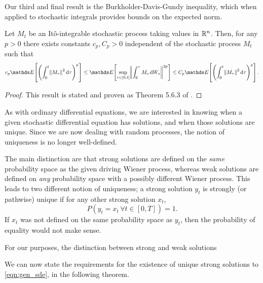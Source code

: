 Our third and final result is the Burkholder-Davis-Gundy inequality, which when applied to stochastic integrals provides bounds on the expected norm.

\begin{theorem}\label{thm:bdg}
	Let \(M_t\) be an It\^o-integrable stochastic process taking values in \(\mathbb{R}^n\).
	Then, for any \(p > 0\) there exists constants \(c_p, C_p > 0\) independent of the stochastic process \(M_t\) such that
	\[
		c_p\avg{\left(\int_0^t{\norm{M_\tau}^2\dif \tau}\right)^p} \leq \avg{\sup_{\tau \in \left[0, t\right]}\norm{\int_0^\tau{M_s\dif W_s}}^{2p}} \leq C_p\avg{\left(\int_0^t{\norm{M_\tau}^2\dif \tau}\right)^p}.
	\]
\end{theorem}
\begin{proof}
	This result is stated and proven as Theorem 5.6.3 of \citet{KallianpurSundar_2014_StochasticAnalysisDiffusion}.
\end{proof}

As with ordinary differential equations, we are interested in knowing when a given stochastic differential equation has solutions, and when those solutions are unique.
Since we are now dealing with random processes, the notion of uniqueness is no longer well-defined.

The main distinction are that strong solutions are defined on the \emph{same} probability space as the given driving Wiener process, whereas weak solutions are defined on \emph{any} probability space with a possibly different Wiener process.
This leads to two different notion of uniqueness; a strong solution \(y_t\) is strongly (or pathwise) unique if for any other strong solution \(x_t\),
\[
	P\left(y_t = x_t \, \forall t \in [0,T]\right) = 1.
\]
If \(x_t\) was not defined on the same probability space as \(y_t\), then the probability of equality would not make sense.

For our purposes, the distinction between strong and weak solutions

We can now state the requirements for the existence of unique strong solutions to \eqref{eqn:gen_sde}, in the following theorem.


